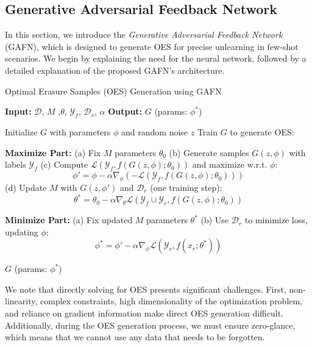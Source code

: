 \documentclass[preprint,12pt]{elsarticle}
\begin{document}
\subsection{Generative Adversarial Feedback Network}

In this section, we introduce the \textit{Generative Adversarial Feedback Network} (GAFN), which is designed to generate OES for precise unlearning in few-shot scenarios. We begin by explaining the need for the neural network, followed by a detailed explanation of the proposed GAFN’s architecture.

% 

\begin{algorithm}[h]
\caption{Optimal Erasure Samples (OES) Generation using GAFN}
\begin{algorithmic}[1]
\STATE \textbf{Input:}  $\mathcal{D}$, $M$ ,$\theta$, $\mathcal{Y}_f$, $\mathcal{D}_s$,  $\alpha$
\STATE \textbf{Output:} $G$ (params: $\phi^*$)

\STATE Initialize $G$ with parameters $\phi$ and random noise $z$
\STATE Train $G$ to generate OES:

\STATE \quad \textbf{Maximize Part:}
\STATE \quad \quad (a) Fix $M$ parameters $\theta_0$
\STATE \quad \quad (b) Generate samples $G(z, \phi)$ with labels $\mathcal{Y}_f$
\STATE \quad \quad (c) Compute $\mathcal{L}(\mathcal{Y}_f, f(G(z, \phi); \theta_0))$ and maximize w.r.t. $\phi$:
\[
\phi' = \phi - \alpha \nabla_\phi \left(-\mathcal{L}(\mathcal{Y}_f, f(G(z, \phi); \theta_0))\right)
\]
\STATE \quad \quad (d) Update $M$ with $G(z, \phi')$ and $\mathcal{D}_r$ (one training step):
\[
\theta^* = \theta_0 - \alpha \nabla_\theta \mathcal{L}(\mathcal{Y}_f \cup \mathcal{Y}_r, f(G(z, \phi); \theta_0))
\]

\STATE \quad \textbf{Minimize Part:}
\STATE \quad \quad (a) Fix updated $M$ parameters $\theta^*$
\STATE \quad \quad (b) Use $\mathcal{D}_r$ to minimize loss, updating $\phi$:
\[
\phi^* = \phi' - \alpha \nabla_\phi \mathcal{L}(\mathcal{Y}_r, f(x_r; \theta^*))
\]

\RETURN $G$ (params: $\phi^*$)
\end{algorithmic}
\end{algorithm}


We note that directly solving for OES presents significant challenges. First, non-linearity, complex constraints, high dimensionality of the optimization problem, and reliance on gradient information make direct OES generation difficult. Additionally, during the OES generation process, we must ensure zero-glance, which means that we cannot use any data that needs to be forgotten.
\end{document}
